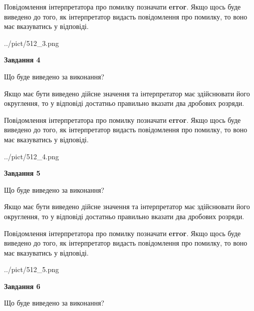 \documentclass[12pt, ukrainian]{article}
\begin{document}
{\begin {Large}
Повідомлення інтерпретатора про помилку позначати \textbf{error}.
Якщо щось буде виведено до того, як інтерпретатор видасть повідомлення про помилку, 
то воно має вказуватись у відповіді. \par

\begin{center}
	{../pict/512_3.png}
\end{center}
\newpage

{\begin {center}\textbf{Завдання 4}\end {center}}\par
Що буде виведено за виконання? \par

Якщо має бути виведено дійсне значення та інтерпретатор має здійснювати його округлення, 
то у відповіді достатньо правильно вказати два дробових розряди.

Повідомлення інтерпретатора про помилку позначати \textbf{error}.
Якщо щось буде виведено до того, як інтерпретатор видасть повідомлення про помилку, 
то воно має вказуватись у відповіді. \par

\begin{center}
	{../pict/512_4.png}
\end{center}
\newpage

{\begin {center}\textbf{Завдання 5}\end {center}}\par
Що буде виведено за виконання? \par

Якщо має бути виведено дійсне значення та інтерпретатор має здійснювати його округлення, 
то у відповіді достатньо правильно вказати два дробових розряди.

Повідомлення інтерпретатора про помилку позначати \textbf{error}.
Якщо щось буде виведено до того, як інтерпретатор видасть повідомлення про помилку, 
то воно має вказуватись у відповіді. \par

\begin{center}
	{../pict/512_5.png}
\end{center}
\newpage

{\begin {center}\textbf{Завдання 6}\end {center}}\par
Що буде виведено за виконання? \par


\end{Large}}
\end{document}
